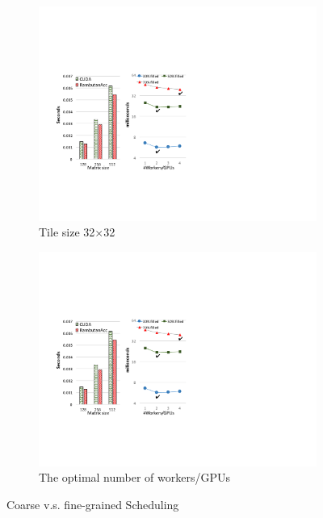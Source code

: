 \begin{figure}[htb]
\centering
\begin{subfigure}{0.23\textwidth}
\includegraphics[width=\textwidth]{figures/choleskyScheResults.pdf}
\caption{Tile size 32$\times$32}
\label{choleskySche}
\end{subfigure}
\begin{subfigure}{0.23\textwidth}
\includegraphics[width=\textwidth]{figures/nWorkers.pdf}
\caption{The optimal number of workers/GPUs}
\label{fig:nWorkers}
\end{subfigure}
\caption{Coarse v.s. fine-grained Scheduling}
\label{fig:coarseFine}
\end{figure}


